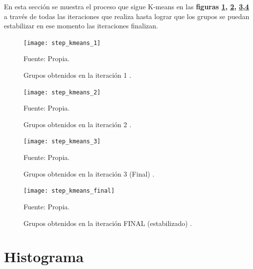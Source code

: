 En esta sección se muestra el proceso que sigue K-means en las \textbf{figuras \ref{fig:step_kmeans_1}, \ref{fig:step_kmeans_2}, \ref{fig:step_kmeans_3},\ref{fig:step_kmeans_final}} a través de todas las iteraciones que realiza hasta lograr que los grupos se puedan estabilizar en ese momento las iteraciones finalizan.

\begin{figure}[H]
	\begin{center}
		\texttt{[image: step\_kmeans\_1]}
	\end{center}
	\begin{center}
		\vskip -0.5cm
		\caption{\label{fig:step_kmeans_1}\small{Grupos obtenidos en la iteración 1 .}}
		{\small{Fuente: Propia. }}
	\end{center}
\end{figure}

\begin{figure}[H]
	\begin{center}
		\texttt{[image: step\_kmeans\_2]}
	\end{center}
	\begin{center}
		\vskip -0.5cm
		\caption{\label{fig:step_kmeans_2}\small{Grupos obtenidos en la iteración 2 .}}
		{\small{Fuente: Propia. }}
	\end{center}
\end{figure}

\begin{figure}[H]
	\begin{center}
		\texttt{[image: step\_kmeans\_3]}
	\end{center}
	\begin{center}
		\vskip -0.5cm
		\caption{\label{fig:step_kmeans_3}\small{Grupos obtenidos en la iteración 3 (Final) .}}
		{\small{Fuente: Propia. }}
	\end{center}
\end{figure}

\begin{figure}[H]
	\begin{center}
		\texttt{[image: step\_kmeans\_final]}
	\end{center}
	\begin{center}
		\vskip -0.5cm
		\caption{\label{fig:step_kmeans_final}\small{Grupos obtenidos en la iteración FINAL (estabilizado) .}}
		{\small{Fuente: Propia. }}
	\end{center}
\end{figure}

\section{Histograma}

